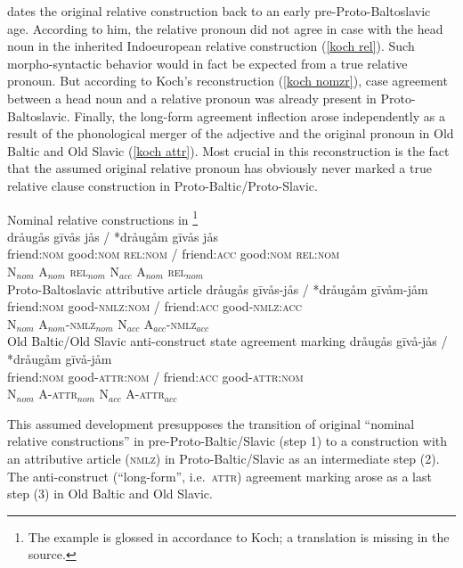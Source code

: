 \citet[468, 470]{koch1999} dates the original relative construction back to an early pre-Proto-Baltoslavic age. According to him, the relative pronoun did not agree in case with the head noun in the inherited Indoeuropean relative construction (\ref{koch rel}). Such morpho-syntactic behavior would in fact be expected from a true relative pronoun. But according to Koch's reconstruction (\ref{koch nomzr}), case agreement between a head noun and a relative pronoun was already present in Proto-Baltoslavic. Finally, the long-form agreement inflection arose independently as a result of the phonological merger of the adjective and the original pronoun in Old Baltic and Old Slavic (\ref{koch attr}). Most crucial in this reconstruction is the fact that the assumed original relative pronoun has obviously never marked a true relative clause construction in Proto-Baltic/Proto-Slavic.
\begin{exe}
\ex \label{koch rel}
\begin{xlist}
\ex	Nominal relative constructions in \footnote{The example is glossed in accordance to Koch; a translation is missing in the source.}\\
\glll	*dråugås gīvås jås / *dråugåm gīvås jås\\
	friend:\textsc{nom} good:\textsc{nom} \textsc{rel:nom} / friend:\textsc{acc} good:\textsc{nom} \textsc{rel:nom}\\
	N$_{nom}$ A$_{nom}$ \textsc{rel}$_{nom}$ { } N$_{acc}$ A$_{nom}$ \textsc{rel}$_{nom}$\\
\ex	Proto-Baltoslavic attributive article \label{koch nomzr}
\glll	*dråugås gīvås-jås / *dråugåm gīvåm-jåm\\
	friend:\textsc{nom} good-\textsc{nmlz:nom} / friend:\textsc{acc} good-\textsc{nmlz:acc}\\
	N$_{nom}$ A$_{nom}$-\textsc{nmlz}$_{nom}$ { } N$_{acc}$ A$_{acc}$-\textsc{nmlz}$_{acc}$\\
\ex	Old Baltic/Old Slavic anti-construct state agreement marking \label{koch attr}
\glll	*dråugås gīvå-jås / *dråugåm gīvå-jåm\\
	friend:\textsc{nom} good-\textsc{attr:nom} / friend:\textsc{acc} good-\textsc{attr:nom}\\
	N$_{nom}$ A-\textsc{attr}$_{nom}$ { } N$_{acc}$ A-\textsc{attr}$_{acc}$\\
\end{xlist}
\end{exe}
This assumed development presupposes the transition of original “nominal relative constructions” in pre-Proto-Baltic/Slavic (step 1) to a construction with an attributive article (\textsc{nmlz}) in Proto-Baltic/Slavic as an intermediate step (2). The anti-construct (“long-form”, i.e.~\textsc{attr}) agreement marking arose as a last step (3) in Old Baltic and Old Slavic.
